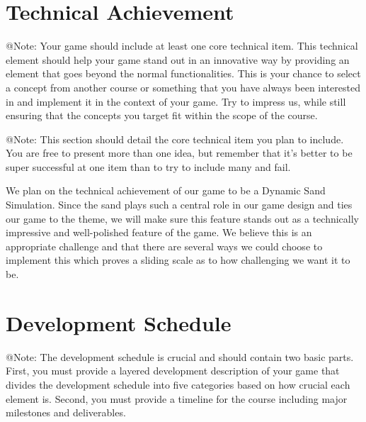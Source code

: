 
\section{Technical Achievement}

\begin{TempText}
	@Note: Your game should include at least one core technical item. This technical element should help your game stand out in an innovative way by providing an element that goes beyond the normal functionalities. This is your chance to select a concept from another course or something that you have always been interested in and implement it in the context of your game. Try to impress us, while still ensuring that the concepts you target fit within the scope of the course.
\end{TempText}

\begin{TempText}
	@Note: This section should detail the core technical item you plan to include. You are free to present more than one idea, but remember that it's better to be super successful at one item than to try to include many and fail.
\end{TempText}

We plan on the technical achievement of our game to be a Dynamic Sand Simulation. Since the sand plays such a central role in our game design and ties our game to the theme, we will make sure this feature stands out as a technically impressive and well-polished feature of the game. We believe this is an appropriate challenge and that there are several ways we could choose to implement this which proves a sliding scale as to how challenging we want it to be.


\section{Development Schedule}

\begin{TempText}
	@Note: The development schedule is crucial and should contain two basic parts. First, you must provide a layered development description of your game that divides the development schedule into five categories based on how crucial each element is. Second, you must provide a timeline for the course including major milestones and deliverables.
\end{TempText}

